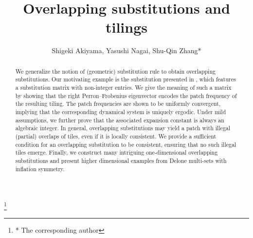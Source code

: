\documentclass[a4]{amsart}
\theoremstyle{definition}
\begin{document}
\title{Overlapping substitutions and tilings}
\author{Shigeki Akiyama, Yasushi Nagai, Shu-Qin Zhang*}
\address[S.~Akiyama]{Institute of Mathematics, University of Tsukuba, 1-1-1 Tennodai, Tsukuba, Ibaraki, zip:305-8571, Japan}
\address[Y.~Nagai]{Center for General Education, Shinshu University, 3-1-1 Asahi, Matsumoto, Nagano, zip:390-8621, Japan}
\address[S.-Q.~Zhang]{School of Mathematics and Statistics, Zhengzhou University, 100 Science Avenue, Zhengzhou, Henan 45001, People's Republic of China}
\thanks{* The corresponding author}


\begin{abstract}
We generalize the notion of (geometric) substitution rule to obtain overlapping substitutions. 
Our motivating example is the substitution presented in \cite{DBZ}, which features a substitution matrix with non-integer entries.
We give the meaning of such a matrix by showing that the right Perron--Frobenius eigenvector encodes the patch frequency of the resulting tiling. The patch frequencies are shown to be uniformly convergent, implying that the corresponding dynamical system is uniquely ergodic. Under mild assumptions, we further prove that the associated expansion constant is always an algebraic integer.
    In general, overlapping substitutions may yield a patch with illegal (partial) overlaps of tiles, even if it is locally consistent.
    We provide a sufficient condition for an overlapping substitution to be consistent, ensuring that no such illegal tiles emerge.  Finally, we construct many intriguing one-dimensional overlapping substitutions and present higher dimensional examples from Delone multi-sets with inflation symmetry.
\end{abstract}


\maketitle

\end{document}
